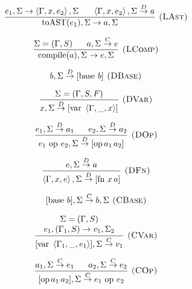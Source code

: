 \documentclass[english]{llncs}
\begin{document}
\begin{figure}
\begin{minipage}[t]{0.59\columnwidth}
{\footnotesize{}
\[
\frac{e_{1},\Sigma\rightarrow\left\langle \Gamma,x,e_{2}\right\rangle ,\Sigma\,\,\,\,\,\,\,\,\,\,\left\langle \Gamma,x,e_{2}\right\rangle ,\Sigma\overset{D}{\rightarrow}a}{\mbox{toAST(\ensuremath{e_{1}})},\Sigma\rightarrow a,\Sigma}\textsc{ (LAst)}
\]
}{\footnotesize \par}

{\footnotesize{}
\[
\frac{\Sigma=(\Gamma,S)\,\,\,\,\,\,\,\,\,\, a,\Sigma\overset{C}{\rightarrow}e}{\mbox{compile(\ensuremath{a})},\Sigma\rightarrow e,\Sigma}\textsc{ (LComp)}
\]
}%
\end{minipage}{\footnotesize{}}%
\begin{minipage}[t]{0.4\columnwidth}%
{\footnotesize{}
\[
b,\Sigma\overset{D}{\rightarrow}[\mbox{base }b]\textsc{ (DBase)}
\]
}{\footnotesize \par}

{\footnotesize{}
\[
\frac{\Sigma=(\Gamma,S,F)}{x,\Sigma\overset{D}{\rightarrow}[\mbox{var }\left\langle \Gamma,\_,x\right\rangle ]}\textsc{ (DVar)}
\]
}{\footnotesize \par}

{\footnotesize{}
\[
\frac{e_{1},\Sigma\overset{D}{\rightarrow}a_{1}\,\,\,\,\,\,\,\,\,\, e_{2},\Sigma\overset{D}{\rightarrow}a_{2}}{e_{1}\mbox{ op }e_{2},\Sigma\overset{D}{\rightarrow}[\mbox{op\,\ensuremath{a_{1}\,}\ensuremath{a_{2}}}]}\textsc{ (DOp)}
\]
}{\footnotesize \par}

{\footnotesize{}
\[
\frac{e,\Sigma\overset{D}{\rightarrow}a}{\left\langle \Gamma,x,e\right\rangle ,\Sigma\overset{D}{\rightarrow}[\mbox{fn }x\, a]}\textsc{ (DFn)}
\]
}{\footnotesize \par}

{\footnotesize{}
\[
[\mbox{base \ensuremath{b}}],\Sigma\overset{C}{\rightarrow}b,\Sigma\textsc{ (CBase)}
\]
}{\footnotesize \par}

{\footnotesize{}
\[
\frac{\begin{array}[t]{c}
\Sigma=(\Gamma,S)\\
e_{1},(\Gamma_{1},S)\rightarrow v_{1},\Sigma_{2}
\end{array}}{[\mbox{var }\left\langle \Gamma_{1},\_,e_{1}\right\rangle ],\Sigma\overset{C}{\rightarrow}v_{1}}\textsc{ (CVar)}
\]
}{\footnotesize \par}

{\footnotesize{}
\[
\frac{a_{1},\Sigma\overset{C}{\rightarrow}e_{1}\,\,\,\,\,\,\,\,\,\, a_{2},\Sigma\overset{C}{\rightarrow}e_{2}}{[\mbox{op\,\ensuremath{a_{1}}\ensuremath{\, a_{2}}}],\Sigma\overset{C}{\rightarrow}e_{1}\mbox{ op }e_{2}}\textsc{ (COp)}
\]
}{\footnotesize \par}


\end{minipage}
\end{figure}
\end{document}
